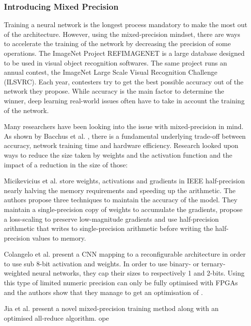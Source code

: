 \subsubsection{Introducing Mixed Precision}

Training a neural network is the longest process mandatory to make the most out of the architecture. However, using the mixed-precision mindset, there are ways to accelerate the training of the network by decreasing the precision of some operations. The ImageNet Project REFIMAGENET is a large database designed to be used in visual object recognition softwares. The same project runs an annual contest, the ImageNet Large Scale Visual Recognition Challenge (ILSVRC). Each year, contesters try to get the best possible accuracy out of the network they propose. While accuracy is the main factor to determine the winner, deep learning real-world issues often have to take in account the training of the network.

Many researchers have been looking into the issue with mixed-precision in mind. As shown by Bacchus et al. \cite{Bacchus2020}, there is a fundamental underlying trade-off between accuracy, network training time and hardware efficiency. Research looked upon ways to reduce the size taken by weights and the activation function and the impact of a reduction in the size of those:

Micikevicius et al. \cite{Micikevicius2017} store weights, activations and gradients in IEEE half-precision nearly halving the memory requirements and speeding up the arithmetic. The authors propose three techniques to maintain the accuracy of the model. They maintain a single-precision copy of weights to accumulate the gradients, propose a loss-scaling to preserve low-magnitude gradients and use half-precision arithmetic that writes to single-precision arithmetic before writing the half-precision values to memory.

Colangelo et al. \cite{Colangelo2018} present a CNN mapping to a reconfigurable architecture in order to use sub 8-bit activation and weights. In order to use binary- or ternary-weighted neural networks, they cap their sizes to respectively 1 and 2-bits. Using this type of limited numeric precision can only be fully optimised with FPGAs and the authors show that they manage to get an optimisation of .

Jia et al. \cite{Jia2018} present a novel mixed-precision training method along with an optimised all-reduce algorithm.
ope

